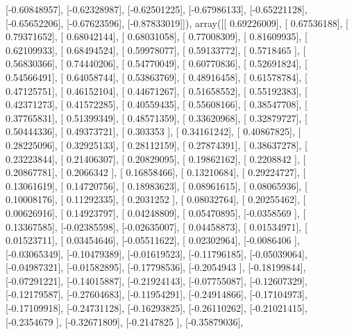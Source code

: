 \documentclass{article}
\begin{document}
       [-0.60848957],
       [-0.62328987],
       [-0.62501225],
       [-0.67986133],
       [-0.65221128],
       [-0.65652206],
       [-0.67623596],
       [-0.87833019]]), array([[ 0.69226009],
       [ 0.67536188],
       [ 0.79371652],
       [ 0.68042144],
       [ 0.68031058],
       [ 0.77008309],
       [ 0.81609935],
       [ 0.62109933],
       [ 0.68494524],
       [ 0.59978077],
       [ 0.59133772],
       [ 0.5718465 ],
       [ 0.56830366],
       [ 0.74440206],
       [ 0.54770049],
       [ 0.60770836],
       [ 0.52691824],
       [ 0.54566491],
       [ 0.64058744],
       [ 0.53863769],
       [ 0.48916458],
       [ 0.61578784],
       [ 0.47125751],
       [ 0.46152104],
       [ 0.44671267],
       [ 0.51658552],
       [ 0.55192383],
       [ 0.42371273],
       [ 0.41572285],
       [ 0.40559435],
       [ 0.55608166],
       [ 0.38547708],
       [ 0.37765831],
       [ 0.51399349],
       [ 0.48571359],
       [ 0.33620968],
       [ 0.32879727],
       [ 0.50444336],
       [ 0.49373721],
       [ 0.303353  ],
       [ 0.34161242],
       [ 0.40867825],
       [ 0.28225096],
       [ 0.32925133],
       [ 0.28112159],
       [ 0.27874391],
       [ 0.38637278],
       [ 0.23223844],
       [ 0.21406307],
       [ 0.20829095],
       [ 0.19862162],
       [ 0.2208842 ],
       [ 0.20867781],
       [ 0.2066342 ],
       [ 0.16858466],
       [ 0.13210684],
       [ 0.29224727],
       [ 0.13061619],
       [ 0.14720756],
       [ 0.18983623],
       [ 0.08961615],
       [ 0.08065936],
       [ 0.10008176],
       [ 0.11292335],
       [ 0.2031252 ],
       [ 0.08032764],
       [ 0.20255462],
       [ 0.00626916],
       [ 0.14923797],
       [ 0.04248809],
       [ 0.05470895],
       [-0.0358569 ],
       [ 0.13367585],
       [-0.02385598],
       [-0.02635007],
       [ 0.04458873],
       [ 0.01534971],
       [ 0.01523711],
       [ 0.03454646],
       [-0.05511622],
       [ 0.02302964],
       [-0.0086406 ],
       [-0.03065349],
       [-0.10479389],
       [-0.01619523],
       [-0.11796185],
       [-0.05039064],
       [-0.04987321],
       [-0.01582895],
       [-0.17798536],
       [-0.2054943 ],
       [-0.18199844],
       [-0.07291221],
       [-0.14015887],
       [-0.21924143],
       [-0.07755087],
       [-0.12607329],
       [-0.12179587],
       [-0.27604683],
       [-0.11954291],
       [-0.24914866],
       [-0.17104973],
       [-0.17109918],
       [-0.24731128],
       [-0.16293825],
       [-0.26110262],
       [-0.21021415],
       [-0.2354679 ],
       [-0.32671809],
       [-0.2147825 ],
       [-0.35879036],
\end{document}
